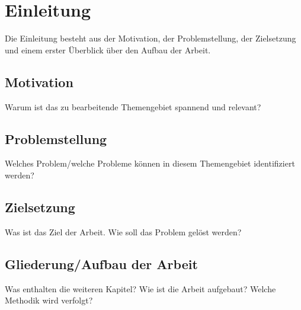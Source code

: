 
\chapter{Einleitung}
\label{ch:Einleitung}
Die Einleitung besteht aus der Motivation, der Problemstellung, der Zielsetzung und einem erster Überblick über den Aufbau der Arbeit.

\section{Motivation}
\label{ch:Einleitung:sec:Motivation}

Warum ist das zu bearbeitende Themengebiet spannend und relevant?

\section{Problemstellung}
\label{ch:Einleitung:sec:Problemstellung}

Welches Problem/welche Probleme können in diesem Themengebiet identifiziert werden?

\section{Zielsetzung}
\label{ch:Einleitung:sec:Zielsetzung}

Was ist das Ziel der Arbeit. Wie soll das Problem gelöst werden?


\section{Gliederung/Aufbau der Arbeit}
\label{ch:Einleitung:sec:Gliederung}

Was enthalten die weiteren Kapitel? Wie ist die Arbeit aufgebaut? Welche Methodik wird verfolgt?



